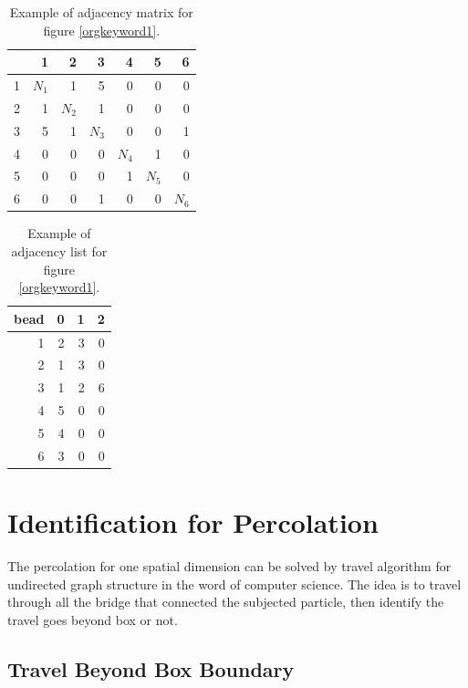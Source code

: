 \documentclass[10pt, a4paper]{article}
\begin{document}
\begin{appendices}
\begin{table}[htb]
\caption{\label{tab:orgtable3}
Example of adjacency matrix for figure \ref{orgkeyword1}.}
\centering
\begin{tabular}{rrrrrrr}
 & 1 & 2 & 3 & 4 & 5 & 6\\
\hline
1 & \(N_1\) & 1 & 5 & 0 & 0 & 0\\
\hline
2 & 1 & \(N_2\) & 1 & 0 & 0 & 0\\
\hline
3 & 5 & 1 & \(N_3\) & 0 & 0 & 1\\
\hline
4 & 0 & 0 & 0 & \(N_4\) & 1 & 0\\
\hline
5 & 0 & 0 & 0 & 1 & \(N_5\) & 0\\
\hline
6 & 0 & 0 & 1 & 0 & 0 & \(N_6\)\\
\end{tabular}
\end{table}

\begin{table}[htb]
\caption{\label{tab:orgtable4}
Example of adjacency list for figure \ref{orgkeyword1}.}
\centering
\begin{tabular}{rrrr}
bead & 0 & 1 & 2\\
\hline
1 & 2 & 3 & 0\\
2 & 1 & 3 & 0\\
3 & 1 & 2 & 6\\
4 & 5 & 0 & 0\\
5 & 4 & 0 & 0\\
6 & 3 & 0 & 0\\
\end{tabular}
\end{table}

\section{Identification for Percolation}
\label{sec:percolation_identification}
The percolation for one spatial dimension can be solved by travel algorithm for undirected graph structure in the word of computer science. The idea is to travel through all the bridge that connected the subjected particle, then identify the travel goes beyond box or not. 


\subsection{Travel Beyond Box Boundary}
\label{sec:orgheadline6}

\end{appendices}
\end{document}
